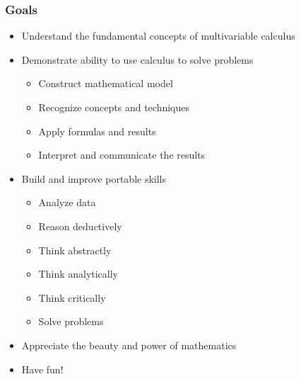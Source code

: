 
\begin{frame}
  \frametitle{Goals}

  \pause

    \begin{itemize}
      \item Understand the fundamental concepts of multivariable calculus \\

      \pause

      \item Demonstrate ability to use calculus to solve problems \\

      \pause

      \begin{itemize}
        \item Construct mathematical model \\

        \item Recognize concepts and techniques \\

        \item Apply formulas and results \\

        \item Interpret and communicate the results \\
      \end{itemize}

      \pause

      \item Build and improve portable skills\\

      \pause

      \begin{itemize}
            \item Analyze data
            \item Reason deductively
            \item Think abstractly
            \item Think analytically
            \item Think critically
            \item Solve problems
      \end{itemize}

      \pause

      \item Appreciate the beauty and power of mathematics \\

      \pause

      \item Have fun!
    \end{itemize}

\end{frame}


